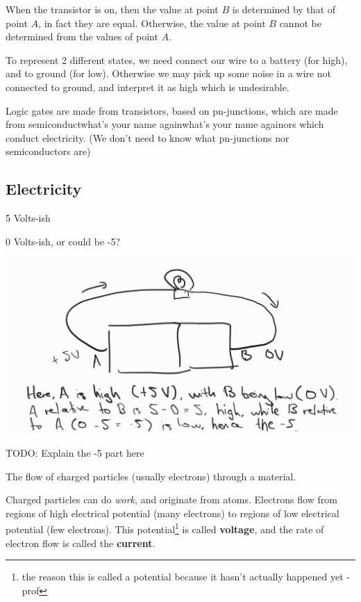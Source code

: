 When the transistor is on, then the value at point $B$ is determined by that of point $A$, in fact they are equal. Otherwise, the value at point $B$ cannot be determined from the values of point $A$.

To represent 2 different states, we need connect our wire to a battery (for high), and to ground (for low). Otherwise we may pick up some noise in a wire not connected to ground, and interpret it as high which is undesirable.

\begin{remark}
    Logic gates are made from transistors, based on pn-junctions, which are made from semiconductwhat's your name againwhat's your name againors which conduct electricity. (We don't need to know what pn-junctions nor semiconductors are)
\end{remark}

\subsection{Electricity}
\begin{definition}
    5 Volts-ish
\end{definition}
\begin{definition}
    0 Volts-ish, or could be -5?
\end{definition}

\includegraphics{csc258/figures/neg5explanation.jpg}

TODO: Explain the -5 part here
\begin{definition}[Electricity]
    The flow of charged particles (usually electrons) through a material. 
\end{definition}
Charged particles can do \textit{work}, and originate from atoms. Electrons flow from regions of high electrical potential (many electrons) to regions of low electrical potential (few electrons). This potential\footnote{the reason this is called a potential because it hasn't actually happened yet - prof} is called \textbf{voltage}, and the rate of electron flow is called the \textbf{current}.

